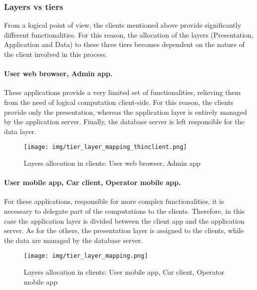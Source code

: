 \subsubsection{Layers vs tiers}
	From a logical point of view, the clients mentioned above provide significantly different functionalities. For this reason, the allocation of the layers (Presentation, Application and Data) to these three tiers becomes dependent on the nature of the client involved in this process.

	\paragraph{User web browser, Admin app.} These applications provide a very limited set of functionalities, relieving them from the need of logical computation client-side. For this reason, the clients provide only the presentation, whereas the application layer is entirely managed by the application server. Finally, the database server is left responsible for the data layer.
		\begin{figure}[h]
			\texttt{[image: img/tier\_layer\_mapping\_thinclient.png]}
			\caption{Layers allocation in clients: User web browser, Admin app}
		\end{figure}

	\paragraph{User mobile app, Car client, Operator mobile app.} For these applications, responsible for more complex functionalities, it is necessary to delegate part of the computations to the clients. Therefore, in this case the application layer is divided between the client app and the application server. As for the others, the presentation layer is assigned to the clients, while the data are managed by the database server.
		\begin{figure}[h]
			\texttt{[image: img/tier\_layer\_mapping.png]}
			\caption{Layers allocation in clients: User mobile app, Car client, Operator mobile app}
		\end{figure}
\FloatBarrier

